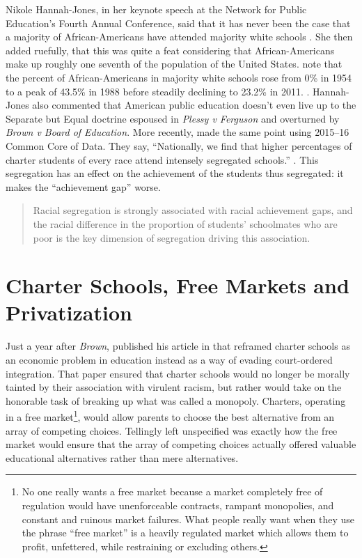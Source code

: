 Nikole Hannah-Jones, in her keynote speech at the Network for Public Education's Fourth Annual Conference, said that it has never been the case that a majority of African-Americans have attended majority white schools \parencite{Hannah-Jones2017}. She then added ruefully, that this was quite a feat considering that African-Americans make up roughly one seventh of the population of the United States. \citeauthor{Orfield.Frankenberg2014} note that the percent of African-Americans in majority white schools rose from 0\% in 1954 to a peak of 43.5\% in 1988 before steadily declining to 23.2\% in 2011. \parencite[Table 3: Percent of Black Students in Majority White Schools, 1954–2011,][10]{Orfield.Frankenberg2014}. Hannah-Jones also commented that American public education doesn't even live up to the Separate but Equal doctrine espoused in \textit{Plessy v Ferguson} and overturned by \textit{Brown v Board of Education}. More recently, \citeauthor{Heilig.etal2019a} made the same point using 2015--16 Common Core of Data. They say, ``Nationally, we find that higher percentages of charter students of every race attend intensely segregated schools.'' \parencite[205]{Heilig.etal2019a}. This segregation has an effect on the achievement of the students thus segregated: it makes the ``achievement gap'' worse. %

\begin{quote}\OnehalfSpacing%
  Racial segregation is strongly associated with racial achievement gaps, and the racial difference in the proportion of students’ schoolmates who are poor is the key dimension of segregation driving this association. 
  \end{quote}

\section{Charter Schools, Free Markets  and Privatization}\label{sec:freemarkets}\indent

Just a year after \textit{Brown},  \textcite{Friedman1955} published his article  in  \parencite{Friedman1955} that reframed charter schools as an economic problem in education instead as a way of evading court-ordered integration. That paper ensured that charter schools would no longer be morally tainted by their association with virulent racism, but rather would take on the honorable task of breaking up what was called a monopoly. Charters, operating in a free market\footnote{No one really wants a free market because a  market completely free of regulation would have unenforceable contracts, rampant monopolies, and constant and ruinous market failures. What people really want when they use the phrase ``free market'' is a heavily regulated market which allows them to profit, unfettered, while restraining or excluding others.}, would allow parents to choose the best alternative from an array of competing choices. Tellingly left unspecified was exactly how the free market would ensure that the array of competing choices actually offered valuable educational alternatives rather than mere alternatives.

